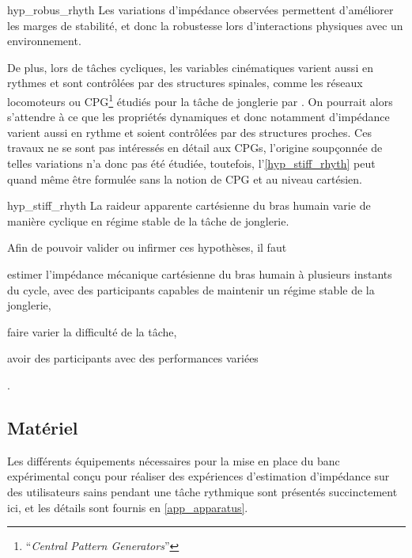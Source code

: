 \begin{hypotheses}{}{hyp_robus_rhyth}
	Les variations d'impédance observées permettent d'améliorer les marges de stabilité, et donc la robustesse lors d'interactions physiques avec un environnement.
\end{hypotheses}

De plus, lors de tâches cycliques, les variables cinématiques varient aussi en rythmes et sont contrôlées par des structures spinales, comme les réseaux locomoteurs ou CPG\footnote{\foreignquote{french}{\textit{Central Pattern Generators}}} étudiés pour la tâche de jonglerie par \textcite{de_rugy_actively_2003,avrin_self-organization_2018}. On pourrait alors s'attendre à ce que les propriétés dynamiques et donc notamment d'impédance varient aussi en rythme et soient contrôlées par des structures proches. Ces travaux ne se sont pas intéressés en détail aux CPGs, l'origine soupçonnée de telles variations n'a donc pas été étudiée, toutefois, l'\cref{hyp_stiff_rhyth} peut quand même être formulée sans la notion de CPG et au niveau cartésien.

\begin{hypotheses}{}{hyp_stiff_rhyth}%
	La raideur apparente cartésienne du bras humain varie de manière cyclique en régime stable de la tâche de jonglerie.
\end{hypotheses}

Afin de pouvoir valider ou infirmer ces hypothèses, il faut 
\begin{enumerate*}[label=\alph*)]
	\item estimer l'impédance mécanique cartésienne du bras humain à plusieurs instants du cycle, avec des participants capables de maintenir un régime stable de la jonglerie,
	\item faire varier la difficulté de la tâche,
	\item avoir des participants avec des performances variées
\end{enumerate*}.

\subsection{Matériel} \label{chap4_sec_exp_sub_mat}

Les différents équipements nécessaires pour la mise en place du banc expérimental conçu pour réaliser des expériences d'estimation d'impédance sur des utilisateurs sains pendant une tâche rythmique sont présentés succinctement ici, et les détails sont fournis en \cref{app_apparatus}.


